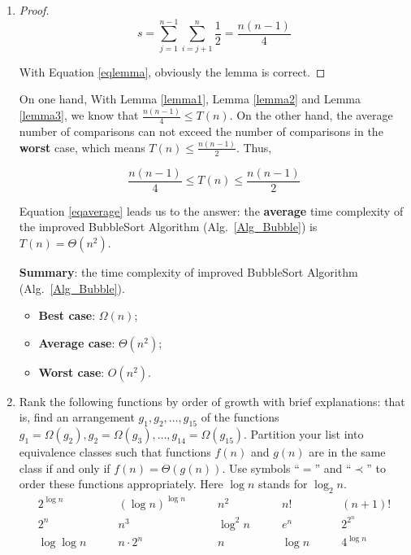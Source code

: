 \documentclass[12pt,a4paper]{article}
\makeatletter
\newtheorem*{solution}{Solution}
\theoremstyle{definition}
\renewenvironment{solution}[1][Solution] {\par\pushQED{\qed}\normalfont\topsep6\p@\@plus6\p@\relax\trivlist\item[\hskip\labelsep\bfseries#1\@addpunct{.}]\ignorespaces}{\popQED\endtrivlist\@endpefalse} \makeatother
\makeatother
\begin{document}
\begin{enumerate}
\begin{solution}
\begin{center}
\begin{minipage}[t]{0.8 \textwidth}
\begin{proof}
            \begin{equation}
                s = \sum_{j=1}^{n-1} \sum_{i=j+1}^n \frac{1}{2} = \frac{n(n-1)}{4}
                \label{eqlemma}
            \end{equation}

            With Equation \eqref{eqlemma}, obviously the lemma is correct.
        \end{proof}
        \end{minipage}
        \end{center}

        On one hand, With Lemma \ref{lemma1}, Lemma \ref{lemma2} and Lemma \ref{lemma3}, we know that $\frac{n(n-1)}{4} \leq T(n)$. On the other hand, the average number of comparisons can not exceed the number of comparisons in the \textbf{worst} case, which means $T(n) \leq \frac{n(n-1)}{2}$. Thus,

        \begin{equation}
            \frac{n(n-1)}{4} \leq T(n) \leq \frac{n(n-1)}{2}
            \label{eqaverage}
        \end{equation}

        Equation \eqref{eqaverage} leads us to the answer: the \textbf{average} time complexity of the improved BubbleSort Algorithm (Alg.~\ref{Alg_Bubble}) is $T(n) = \Theta(n^2)$.

        \textbf{Summary}: the time complexity of improved BubbleSort Algorithm (Alg.~\ref{Alg_Bubble}).
        \begin{itemize}
        \item \textbf{Best case}: $\Omega(n)$;
        \item \textbf{Average case}: $\Theta(n^2)$;
        \item \textbf{Worst case}: $O(n^2)$.
        \end{itemize}
    \end{solution}

    \item

    Rank the following functions by order of growth with brief explanations: that is, find an arrangement $g_1, g_2, \ldots , g_{15}$ of the functions $g_1 = \Omega(g_2), g_2 = \Omega(g_3), \ldots, g_{14} = \Omega(g_{15})$.  Partition your list into equivalence classes such that functions $f(n)$ and $g(n)$ are in the same class if and only if $f(n) = \Theta(g(n))$. Use symbols ``$=$'' and ``$\prec$'' to order these functions appropriately. Here $\log n$ stands for $\log_2 n$.
    $$
    \begin{array}{ccccc}
        2^{\log n} \quad & \quad (\log n)^{\log n} \quad & \quad n^2 \quad & \quad n! \quad & \quad (n + 1)! \\
        2^n \quad & \quad n^3 \quad & \quad \log^2 n \quad & \quad e^n \quad & \quad 2^{2^n} \\
        \log\log n \quad & \quad n\cdot 2^n \quad & \quad n \quad & \quad \log n \quad & \quad 4^{\log n} \\
    \end{array}
    $$


\end{enumerate}
\end{document}
